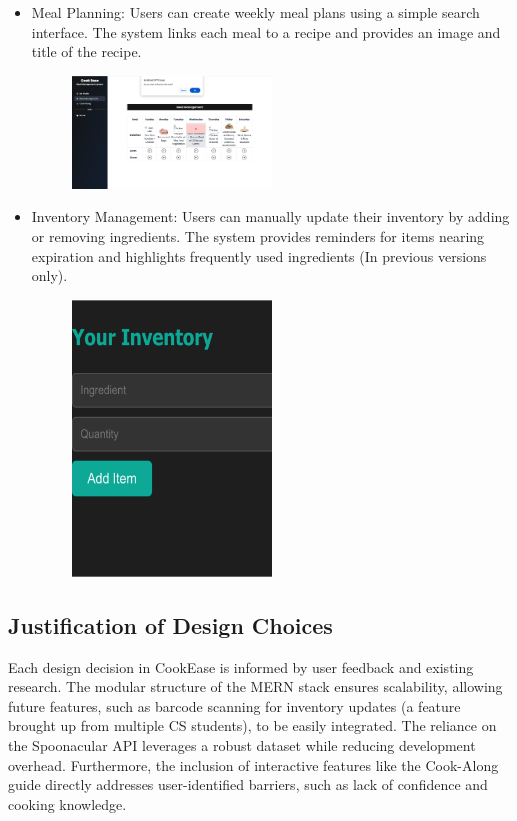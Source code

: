 \documentclass[10pt,twocolumn]{article}
\begin{document}
\begin{itemize}
    \item Meal Planning: Users can create weekly meal plans using a simple search interface. The system links each meal to a recipe and provides an image and title of the recipe.
    \begin{figure}[h!]
    \includegraphics[width=0.5\textwidth]{images/MealPlan.png}
    \centering
    \end{figure} 
 
    \item Inventory Management: Users can manually update their inventory by adding or removing ingredients. The system provides reminders for items nearing expiration and highlights frequently used ingredients (In previous versions only). 
    \begin{figure}[h!]
    \includegraphics[width=0.5\textwidth]{images/OldInventory.png}
    \centering
    \end{figure} 
    \end{itemize}

\subsection{Justification of Design Choices}
Each design decision in CookEase is informed by user feedback and existing research. The modular structure of the MERN stack ensures scalability, allowing future features, such as barcode scanning for inventory updates (a feature brought up from multiple CS students), to be easily integrated. The reliance on the Spoonacular API leverages a robust dataset while reducing development overhead. Furthermore, the inclusion of interactive features like the Cook-Along guide directly addresses user-identified barriers, such as lack of confidence and cooking knowledge.
\end{document}

